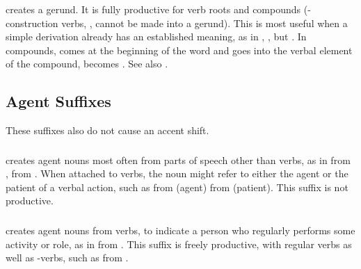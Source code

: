 \subsubsection{}  creates a gerund.  It is fully
productive for verb roots and compounds (-con\-struc\-tion verbs,
, cannot be made into a gerund).  This is
most useful when a simple  derivation already has an
established meaning, as in  ,  ,
but  .  In compounds,  comes at the
beginning of the word and  goes into the verbal element of the
compound,  becomes . See also
.
\label{lingop:gerund}


\subsection{Agent Suffixes} These suffixes also do not cause an accent
shift.

\subsubsection{} 
 creates agent nouns most often from parts of speech other than
verbs, as in  
from  ,   from  .  When
attached to verbs, the noun might refer to either the agent or the
patient of a verbal action, such as  
from   (agent)  
from   (patient).  This suffix is not
productive.

\subsubsection{}  creates agent nouns from verbs, to indicate a
person who regularly performs some activity or role, as in
  from  .  This suffix is freely
productive, with regular verbs as well as -verbs, such
as   from  .


